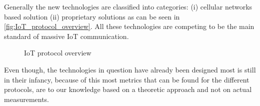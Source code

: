 Generally the new technologies are classified into categories: (i) cellular networks based solution (ii) proprietary solutions as can be seen in \autoref{fig:IoT_protocol_overview}. All these technologies are competing to be the main standard of massive \gls{IoT} communication. 

\begin{figure}[H]
\centering
\caption{\gls{IoT} protocol overview}
\label{fig:IoT_protocol_overview}
\end{figure}


Even though, the technologies in question have already been designed most is still in their infancy, because of this most metrics that can be found for the different protocols, are to our knowledge based on a theoretic approach and not on actual measurements. 

\begin{table}[H]
\centering
{}
\caption{Comparison of performance metrics between cellular solutions and proprietary solutions \citep{NB_comp}}%
\label{tab:tech_comparison1}
\end{table}



